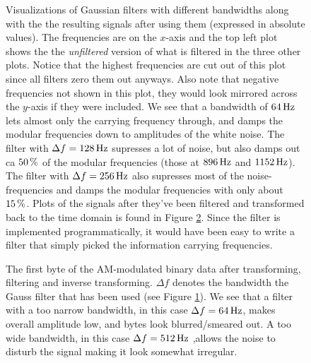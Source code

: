 \documentclass[12pt,a4paper]{article}
\begin{document}
\begin{figure}
  \begin{small}
  \centering
  
  \caption{
    Visualizations of Gaussian filters with different bandwidths
    along with the the resulting signals after using them (expressed
    in absolute values).
    The frequencies are on the $x$-axis and the top left plot shows the
    the \emph{unfiltered} version of what is filtered in the three other plots.
    Notice that the highest frequencies are cut out of this plot since
    all filters zero them out anyways.
    Also note that negative frequencies not shown in this plot, they would
    look mirrored across the $y$-axis if they were included.
    We see that a bandwidth of $\unit[64]{Hz}$ lets almost only the carrying frequency
    through, and damps the modular frequencies down to amplitudes of the white
    noise. The filter with $\Delta f = \unit[128]{Hz}$ supresses a lot of noise,
    but also damps out ca $\unit[50]{\%}$ of the modular frequencies 
    (those at $\unit[896]{Hz}$ and $\unit[1152]{Hz}$).
    The filter with
    $\Delta f = \unit[256]{Hz}$ also supresses most of the noise-frequencies
    and damps the modular frequencies with only about $\unit[15]{\%}$.
    Plots of the signals after they've been filtered and transformed back
    to the time domain is found in Figure \ref{fig:different_bandwidths}.
    Since the filter is implemented programmatically, it would have been easy to
    write a filter that simply picked the information carrying frequencies.
  }
  \label{fig:different_filters}
  \end{small}
\end{figure}

\begin{figure}
  \begin{small}
  \centering
  
  \caption{
    The first byte of the AM-modulated binary data after transforming,
    filtering and inverse transforming. $\Delta f$ denotes the bandwidth
    the Gauss filter that has been used (see Figure \ref{fig:different_filters}).
    We see that a filter with a too narrow bandwidth, in this case $\Delta f = \unit[64]{Hz}$,
    makes overall amplitude low, and bytes look blurred/smeared out.
    A too wide bandwidth, in this case $\Delta f = \unit[512]{Hz}$ ,allows
    the noise to disturb the signal making it look somewhat irregular.
  }
  \label{fig:different_bandwidths}
  \end{small}
\end{figure}
\end{document}
